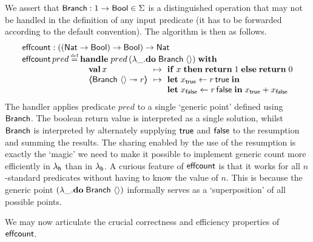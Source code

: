 \documentclass[12pt,phd,lfcs,twoside,openright,logo,leftchapter,normalheadings]{infthesis}
\theoremstyle{plain}
\theoremstyle{definition}
\begin{document}
We assert that $\mathsf{Branch} : 1 \to \mathsf{Bool} \in \Sigma$ is a
distinguished operation that may not be handled in the definition of
any input predicate (it has to be forwarded according to the default
convention).
%
The algorithm is then as follows.
%
{
\[
  \bl
    \ECount : ((\Nat \to \Bool) \to \Bool) \to \Nat\\
    \ECount\,pred \defas
      \bl
      \Handle\; pred\,(\lambda\_. \Do\; \Branch\; \Unit)\; \With\\
      \quad\ba[t]{@{}l@{\hspace{1.5ex}}c@{\hspace{1.5ex}}l@{}}
           \Val\, x         &\mapsto& \If\; x\; \Then\;\Return\; 1 \;\Else\;\Return\; 0 \\
           \OpCase{\Branch}{\Unit}{r} &\mapsto&
              \ba[t]{@{}l}
                \Let\;x_\True \revto  r\,\True\; \In\\
                \Let\;x_\False \revto r\,\False\;\In\;
                x_\True + x_\False \\
              \ea
           \ea \\
      \el
  \el
\]}%
%
The handler applies predicate $pred$ to a single `generic point'
defined using $\mathsf{Branch}$. The boolean return value is interpreted as a
single solution, whilst $\mathsf{Branch}$ is interpreted by alternately
supplying $\mathsf{true}$ and $\mathsf{false}$ to the resumption and summing the
results.  The sharing enabled by the use of the resumption is exactly
the `magic' we need to make it possible to implement generic count
more efficiently in $\lambda_{\mathsf{h}}$ than in $\lambda_{\mathsf{b}}$.
%
A curious feature of $\mathsf{effcount}$ is that it works for all $n$-standard
predicates without having to know the value of $n$. This is because
the generic point $(\lambda\_.\mathbf{do}\;\mathsf{Branch}~\langle  \rangle)$ informally serves as a
`superposition' of all possible points.

We may now articulate the crucial correctness and efficiency
properties of $\mathsf{effcount}$.
\end{document}
